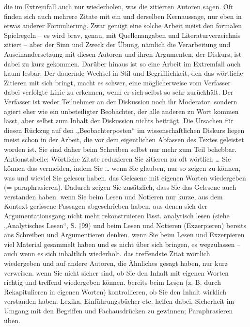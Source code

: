 \documentclass[]{book}
\theoremstyle{definition}
\theoremstyle{definition}
\theoremstyle{definition}
\theoremstyle{remark}
\begin{document}
die im Extremfall auch nur wiederholen, was die zitierten Autoren sagen.
Oft finden sich auch mehrere Zitate mit ein und derselben Kernaussage,
nur eben in etwas anderer Formulierung. Zwar genügt eine solche Arbeit
meist den formalen Spielregeln -- es wird brav, genau, mit
Quellenangaben und Literaturverzeichnis zitiert -- aber der Sinn und
Zweck der Übung, nämlich die Verarbeitung und Auseinandersetzung mit
diesen Autoren und ihren Argumenten, der Diskurs, ist dabei zu kurz
gekommen. Darüber hinaus ist so eine Arbeit im Extremfall auch kaum
lesbar: Der dauernde Wechsel in Stil und Begrifflichkeit, den das
wörtliche Zitieren mit sich bringt, macht es schwer, eine möglicherweise
vom Verfasser dabei verfolgte Linie zu erkennen, wenn er sich selbst so
sehr zurückhält. Der Verfasser ist weder Teilnehmer an der Diskussion
noch ihr Moderator, sondern agiert eher wie ein unbeteiligter
Beobachter, der alle anderen zu Wort kommen lässt, aber selbst zum
Inhalt der Diskussion nichts beiträgt. Die Ursachen für diesen Rückzug
auf den „Beobachterposten`` im wissenschaftlichen Diskurs liegen meist
schon in der Arbeit, die vor dem eigentlichen Abfassen des Textes
geleistet worden ist. Sie sind daher beim Schreiben selbst nur mehr zum
Teil behebbar. Aktionstabelle: Wörtliche Zitate reduzieren Sie zitieren
zu oft wörtlich \ldots{} Sie können das vermeiden, indem Sie \ldots{}
wenn Sie glauben, nur so zeigen zu können, was und wieviel Sie gelesen
haben. das Gelesene mit eigenen Worten wiedergeben (= paraphrasieren).
Dadurch zeigen Sie zusätzlich, dass Sie das Gelesene auch verstanden
haben. wenn Sie beim Lesen und Notieren nur kurze, aus dem Kontext
gerissene Passagen abgeschrieben haben, aus denen sich der
Argumentationsgang nicht mehr rekonstruieren lässt. analytisch lesen
(siehe „Analytisches Lesen``, S. †99) und beim Lesen und Notieren
(Exzerpieren) bereits ans Schreiben und Argumentieren denken. wenn Sie
beim Lesen und Exzerpieren viel Material gesammelt haben und es nicht
über sich bringen, es wegzulassen -- auch wenn es sich inhaltlich
wiederholt. das treffendste Zitat wörtlich wiedergeben und auf andere
Autoren, die Ähnliches gesagt haben, nur kurz verweisen. wenn Sie nicht
sicher sind, ob Sie den Inhalt mit eigenen Worten richtig und treffend
wiedergeben können. bereits beim Lesen (z. B. durch Rekapitulieren in
eigenen Worten) kontrollieren, ob Sie den Inhalt wirklich verstanden
haben. Lexika, Einführungsbücher etc. helfen dabei, Sicherheit im Umgang
mit den Begriffen und Fachausdrücken zu gewinnen; Paraphrasieren üben.
\end{document}
